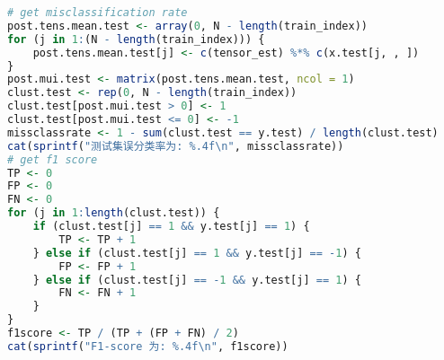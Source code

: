 \documentclass[AutoFakeBold]{LZUThesis}
\begin{document}
\begin{lstlisting}[language=R, caption = {BT-SVM}算法]
# get misclassification rate
post.tens.mean.test <- array(0, N - length(train_index))
for (j in 1:(N - length(train_index))) {
	post.tens.mean.test[j] <- c(tensor_est) %*% c(x.test[j, , ])
}
post.mui.test <- matrix(post.tens.mean.test, ncol = 1)
clust.test <- rep(0, N - length(train_index))
clust.test[post.mui.test > 0] <- 1
clust.test[post.mui.test <= 0] <- -1
missclassrate <- 1 - sum(clust.test == y.test) / length(clust.test)
cat(sprintf("测试集误分类率为: %.4f\n", missclassrate))
# get f1 score
TP <- 0
FP <- 0
FN <- 0
for (j in 1:length(clust.test)) {
	if (clust.test[j] == 1 && y.test[j] == 1) {
		TP <- TP + 1
	} else if (clust.test[j] == 1 && y.test[j] == -1) {
		FP <- FP + 1
	} else if (clust.test[j] == -1 && y.test[j] == 1) {
		FN <- FN + 1
	}
}
f1score <- TP / (TP + (FP + FN) / 2)
cat(sprintf("F1-score 为: %.4f\n", f1score))

\end{lstlisting}
\end{document}
